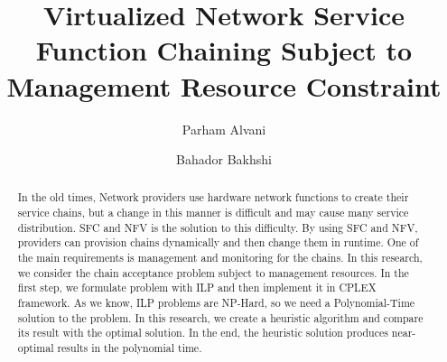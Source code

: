 \documentclass[3p]{elsarticle}
\begin{document}
\begin{frontmatter}

\title{Virtualized Network Service Function Chaining Subject to Management Resource Constraint}

\author[aut]{Parham Alvani }
\author[aut]{Bahador Bakhshi}


\address[aut]{Amirkabir University of Technology, Tehran, Iran}

\begin{abstract}
In the old times, Network providers use hardware network functions to create their service chains, but a change in this manner is difficult and may cause many service distribution.
SFC and NFV is the solution to this difficulty. By using SFC and NFV, providers can provision chains dynamically and then change them in runtime.
One of the main requirements is management and monitoring for the chains.
In this research, we consider the chain acceptance problem subject to management resources. In the first step, we formulate
problem with ILP and then implement it in CPLEX framework. As we know, ILP problems are NP-Hard, so we need a Polynomial-Time solution to the problem.
In this research, we create a heuristic algorithm and compare its result with the optimal solution. In the end, the heuristic solution produces near-optimal results in the polynomial time.
\end{abstract}

\begin{keyword}
\end{keyword}

\end{frontmatter}




\end{document}
